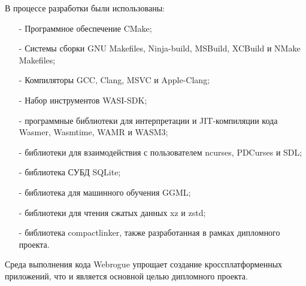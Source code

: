 В процессе разработки были использованы:
\begin{itemize}
    \item[-] Программное обеспечение CMake;
    \item[-] Системы сборки GNU Makefiles, Ninja-build, MSBuild, XCBuild и NMake Makefiles;
    \item[-] Компиляторы GCC, Clang, MSVC и Apple-Clang;
    \item[-] Набор инструментов WASI-SDK;
    \item[-] программные библиотеки для интерпретации и JIT-компиляции кода Wasmer, Wasmtime, WAMR и WASM3;
    \item[-] библиотеки для взаимодействия с пользователем ncurses, PDCurses и SDL;\item[-] библиотека СУБД SQLite;
    \item[-] библиотека для машинного обучения GGML;
    \item[-] библиотеки для чтения сжатых данных xz и zstd;
    \item[-] библиотека compactlinker, также разработанная в рамках дипломного проекта.
\end{itemize}

Среда выполнения кода Webrogue упрощает создание кроссплатформенных приложений, что и является основной целью дипломного проекта.
